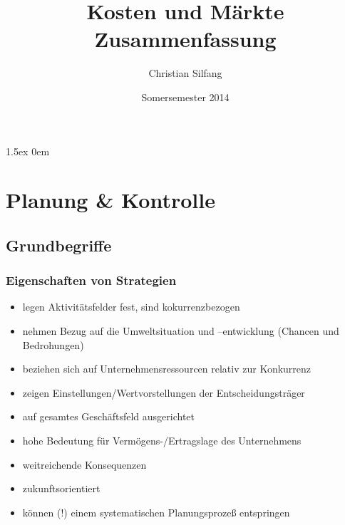 \documentclass[a4paper,11pt, twoside]{article}
\begin{document}
\title{
\textbf{Kosten und Märkte}\\
Zusammenfassung
}

\author{Christian Silfang}
\date{Somersemester 2014}

\parskip1.5ex
\parindent0em

\pagestyle{empty}
\maketitle
\thispagestyle{empty}
\cleardoublepage


\tableofcontents
\cleardoublepage

\pagestyle{fancy}
	\renewcommand{\sectionmark}[1]{\markboth{#1}{}}
	\fancyhf{}
	\fancyhead[EL]{\thesection { }\leftmark}
	\fancyhead[OR]{{ }\rightmark}
	\renewcommand{\headrulewidth}{0.4pt}
	
  \fancyfoot[EL]{\textbf{\thepage}}
	\fancyfoot[OR]{\textbf{\thepage}} 
	
	\setcounter{page}{1}

\section{Planung \& Kontrolle}

\subsection{Grundbegriffe}

\subsubsection*{Eigenschaften von Strategien}
\begin{itemize}
	\item legen Aktivitätsfelder fest, sind kokurrenzbezogen
	\item nehmen Bezug auf die Umweltsituation und –entwicklung (Chancen und Bedrohungen)
	\item beziehen sich auf Unternehmensressourcen relativ zur Konkurrenz
	\item zeigen Einstellungen/Wertvorstellungen der Entscheidungsträger
	\item auf gesamtes Geschäftsfeld ausgerichtet
	\item hohe Bedeutung für Vermögens-/Ertragslage des Unternehmens
	\item weitreichende Konsequenzen
	\item zukunftsorientiert
	\item können (!) einem systematischen Planungsprozeß entspringen
\end{itemize}
\end{document}
